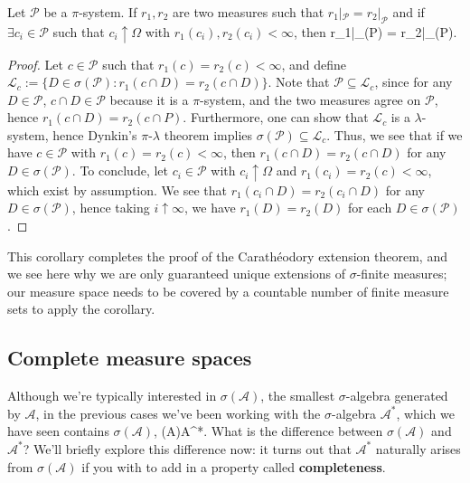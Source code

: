 \begin{corollary}
	Let $\mathcal P$ be a $\pi$-system. If $r_1, r_2$ are two measures such that $r_1|_{\mathcal P} = r_2|_{\mathcal P}$ and if $\exists c_i\in\mathcal P$ such that $c_i\uparrow\Omega$ with $r_1(c_i), r_2(c_i) < \infty$, then 
	\eq
		r_1|_{\sigma(\mathcal P)} = r_2|_{\sigma(\mathcal P)}.
	\qe
\end{corollary}

\begin{proof}
	Let $c\in\mathcal P$ such that $r_1(c) = r_2(c) < \infty$, and define $\mathcal L_c := \{D\in\sigma(\mathcal P) : r_1(c\cap D) = r_2(c\cap D) \}$. Note that $\mathcal P\subseteq\mathcal L_c$, since for any $D\in\mathcal P$, $c\cap D\in\mathcal P$ because it is a $\pi$-system, and the two measures agree on $\mathcal P$, hence $r_1(c\cap D) = r_2(c\cap P)$. Furthermore, one can show that $\mathcal L_c$ is a $\lambda$-system, hence Dynkin's $\pi$-$\lambda$ theorem implies $\sigma(\mathcal P)\subseteq\mathcal L_c$. Thus, we see that if we have $c\in\mathcal P$ with $r_1(c) = r_2(c) < \infty$, then $r_1(c\cap D) = r_2(c\cap D)$ for any $D\in\sigma(\mathcal P)$. To conclude, let $c_i\in\mathcal P$ with $c_i\uparrow\Omega$ and $r_1(c_i) = r_2(c) < \infty$, which exist by assumption. We see that $r_1(c_i\cap D) = r_2(c_i\cap D)$ for any $D\in\sigma(\mathcal P)$, hence taking $i\uparrow\infty$, we have $r_1(D) = r_2(D)$ for each $D\in\sigma(\mathcal P)$. 
\end{proof}

This corollary completes the proof of the Carath\'eodory extension theorem, and we see here why we are only guaranteed unique extensions of $\sigma$-finite measures; our measure space needs to be covered by a countable number of finite measure sets to apply the corollary. 


\subsection{Complete measure spaces}

Although we're typically interested in $\sigma(\mathcal A)$, the smallest $\sigma$-algebra generated by $\mathcal A$, in the previous cases we've been working with the $\sigma$-algebra $\mathcal A^*$, which we have seen contains $\sigma(\mathcal A)$,
\eq
	\sigma(\mathcal A)\subseteq\mathcal A^*.
\qe
What is the difference between $\sigma(\mathcal A)$ and $\mathcal A^*$? We'll briefly explore this difference now: it turns out that $\mathcal A^*$ naturally arises from $\sigma(\mathcal A)$ if you with to add in a property called \textbf{completeness}. 

